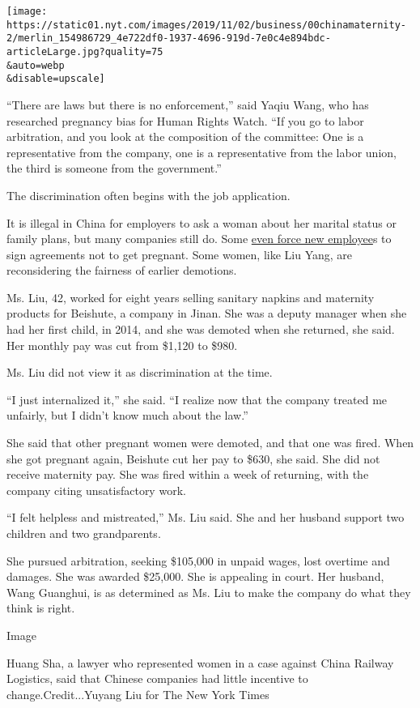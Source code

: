\texttt{[image: https://static01.nyt.com/images/2019/11/02/business/00chinamaternity-2/merlin\_154986729\_4e722df0-1937-4696-919d-7e0c4e894bdc-articleLarge.jpg?quality=75\\\&auto=webp\\\&disable=upscale]}

``There are laws but there is no enforcement,'' said Yaqiu Wang, who has
researched pregnancy bias for Human Rights Watch. ``If you go to labor
arbitration, and you look at the composition of the committee: One is a
representative from the company, one is a representative from the labor
union, the third is someone from the government.''

The discrimination often begins with the job application.

It is illegal in China for employers to ask a woman about her marital
status or family plans, but many companies still do. Some
\href{https://www.nytimes.com/2019/07/16/world/asia/china-women-discrimination.html}{even
force new employee}s to sign agreements not to get pregnant. Some women,
like Liu Yang, are reconsidering the fairness of earlier demotions.

Ms. Liu, 42, worked for eight years selling sanitary napkins and
maternity products for Beishute, a company in Jinan. She was a deputy
manager when she had her first child, in 2014, and she was demoted when
she returned, she said. Her monthly pay was cut from \$1,120 to \$980.

Ms. Liu did not view it as discrimination at the time.

``I just internalized it,'' she said. ``I realize now that the company
treated me unfairly, but I didn't know much about the law.''

She said that other pregnant women were demoted, and that one was fired.
When she got pregnant again, Beishute cut her pay to \$630, she said.
She did not receive maternity pay. She was fired within a week of
returning, with the company citing unsatisfactory work.

``I felt helpless and mistreated,'' Ms. Liu said. She and her husband
support two children and two grandparents.

She pursued arbitration, seeking \$105,000 in unpaid wages, lost
overtime and damages. She was awarded \$25,000. She is appealing in
court. Her husband, Wang Guanghui, is as determined as Ms. Liu to make
the company do what they think is right.

Image

Huang Sha, a lawyer who represented women in a case against China
Railway Logistics, said that Chinese companies had little incentive to
change.Credit...Yuyang Liu for The New York Times

